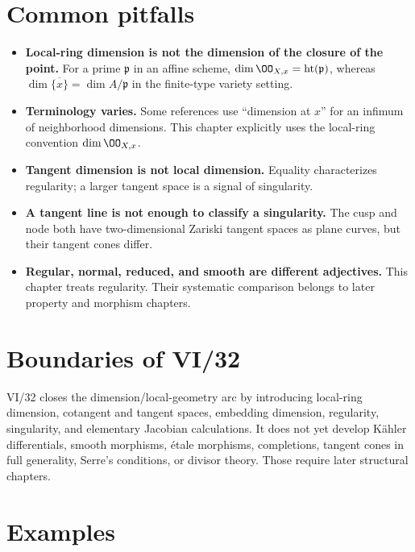 \section{Common pitfalls}\label{sec:vi32-pitfalls}
\begin{itemize}
\item \textbf{Local-ring dimension is not the dimension of the closure of the point.}  For a prime $\mathfrak p$ in an
affine scheme, $\dim\OO_{X,x}=\operatorname{ht}(\mathfrak p)$, whereas $\dim\overline{\{x\}}=\dim A/\mathfrak p$ in the
finite-type variety setting.
\item \textbf{Terminology varies.}  Some references use ``dimension at $x$'' for an infimum of neighborhood dimensions.
This chapter explicitly uses the local-ring convention $\dim\OO_{X,x}$.
\item \textbf{Tangent dimension is not local dimension.}  Equality characterizes regularity; a larger tangent space is a
signal of singularity.
\item \textbf{A tangent line is not enough to classify a singularity.}  The cusp and node both have two-dimensional
Zariski tangent spaces as plane curves, but their tangent cones differ.
\item \textbf{Regular, normal, reduced, and smooth are different adjectives.}  This chapter treats regularity.  Their
systematic comparison belongs to later property and morphism chapters.
\end{itemize}

\section{Boundaries of VI/32}\label{sec:vi32-boundaries}
VI/32 closes the dimension/local-geometry arc by introducing local-ring dimension, cotangent and tangent spaces,
embedding dimension, regularity, singularity, and elementary Jacobian calculations.  It does not yet develop Kähler
differentials, smooth morphisms, étale morphisms, completions, tangent cones in full generality, Serre's conditions, or
divisor theory.  Those require later structural chapters.

\section{Examples}



